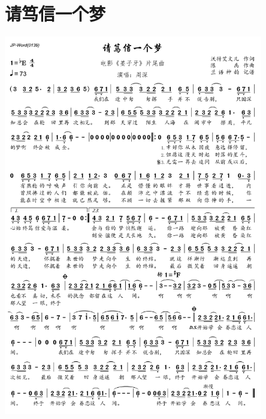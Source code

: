 \documentclass[cn,pad,twocol]{elegantbook}
\begin{document}
\section{请笃信一个梦} \includegraphics[width=0.85\textwidth]{rpi400/20210206请笃信一个梦.png}
\end{document}
